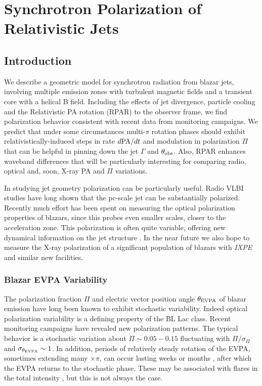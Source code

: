 \chapter{Synchrotron Polarization of Relativistic Jets}
\label{chap:synch}

\section{Introduction}
We describe a geometric model for synchrotron radiation from blazar jets, involving multiple emission zones with turbulent magnetic fields and a transient core with a helical B field. Including the effects of jet divergence, particle cooling and the Relativistic PA rotation (RPAR) to the observer frame, we find polarization behavior consistent with recent data from monitoring campaigns. We predict that under some circumstances multi-$\pi$ rotation phases should exhibit relativistically-induced steps in rate $d{\rm PA}/dt$ and modulation in polarization $\Pi$ that can be helpful in pinning down the jet $\Gamma$ and $\theta_{\rm obs}$. Also, RPAR enhances waveband differences that will be particularly interesting for comparing radio, optical and, soon, X-ray PA and $\Pi$ variations.


In studying jet geometry polarization can be particularly useful. Radio VLBI studies have long shown that the pc-scale jet can be substantially polarized. Recently much effort has been spent on measuring the optical polarization properties of blazars, since this probes even smaller scales, closer to the acceleration zone. This polarization is often quite variable, offering new dynamical information on the jet structure \citep[e.g.][]{blinov_robopol_2015, lynch_green_2018}.
In the near future we also hope to measure the X-ray polarization of a significant population of blazars with {\it IXPE} \citep{weisskopf_imaging_2016} and similar new facilities. 
\subsection{Blazar EVPA Variability}

The polarization fraction $\Pi$ and electric vector position angle $\theta_{\rm EVPA}$ of blazar emission have long been known to exhibit stochastic variability. Indeed optical polarization variability is a defining property of the BL Lac class. Recent monitoring campaigns have revealed new polarization patterns. The typical behavior is a stochastic variation about $\Pi\sim 0.05-0.15$ fluctuating with $\Pi/\sigma_\Pi$ and $\sigma_{\theta_{\rm EVPA}} \sim 1$. In addition, periods of relatively steady rotation of the EVPA, sometimes extending many $\times \pi$, can occur lasting weeks or months \citep{blinov_robopol_2015}, after which the EVPA returns to the stochastic phase. These may be associated with flares in the total intensity \citep{blinov_robopol_2016}, but this is not always the case.

